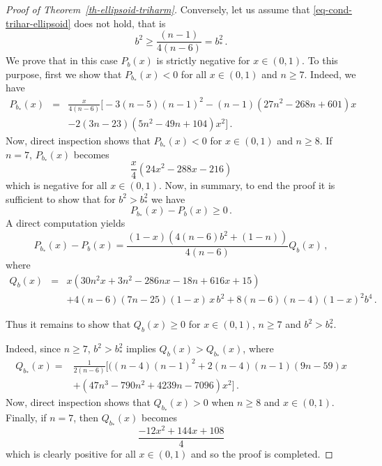 \documentclass[10pt,a4paper]{amsart}
\begin{document}
\begin{proof}[Proof of Theorem~\ref{th-ellipsoid-triharm}]
Conversely, let us assume that \eqref{eq-cond-trihar-ellipsoid} does not hold, that is
\[
b^2\geq\frac{(n-1)}{4(n-6)}=b_*^2\,.
\]
We prove that in this case $P_{b}(x)$ is strictly negative for $x \in(0,1)$. To this purpose, first we show that $P_{b_*}(x)<0$ for all $x\in (0,1)$ and $n\geq 7$. Indeed, we have 
\begin{eqnarray*}
P_{b_*}(x)&=& \frac{x}{4(n-6)}\Big [-3 (n-5) (n-1)^2-(n-1) \left(27 n^2-268 n+601\right) x\\
&&-2 (3 n-23) \left(5 n^2-49 n+104\right) x^2 \Big ]\,.
\end{eqnarray*}
Now, direct inspection shows that $P_{b_*}(x)<0$ for $x\in (0,1)$ and $n\geq 8$. If $n=7$, $P_{b_*}(x)$ becomes
\[
\frac{x}{4}(24 x^2-288 x-216)
\]
which is negative for all $x\in (0,1)$. Now, in summary, to end the proof it is sufficient to show that for $b^2> b_*^2$ we have
\[
P_{b_*}(x)-P_{b}(x)\geq 0\,.
\]
A direct computation yields
\[
P_{b_*}(x)-P_{b}(x)=\frac{(1-x) (4 (n-6)b^2+(1-n))}{4 (n-6)} Q_b(x)\,,
\]
where
\begin{eqnarray*}
Q_b(x)&=&x \left(30 n^2 x+3 n^2-286 n x-18 n+616 x+15\right)\\
&&+4 (n-6) (7 n-25) (1-x)\, x\, b^2+8 (n-6) (n-4) (1-x)^2 b^4\,.
\end{eqnarray*}

Thus it remains to show that $Q_b(x)\geq 0$ for $x\in (0,1)$, $n\geq 7$ and $b^2> b_*^2$.

Indeed, since $n\geq 7$, $b^2> b_*^2$ implies $Q_b(x)>Q_{b_*}(x)$, where
\[
\begin{split}
Q_{b_*}(x)=&\frac{1}{2(n-6)}\Big[((n-4) (n-1)^2+2 (n-4) (n-1) (9 n-59) x\\
&+\left(47 n^3-790 n^2+4239 n-7096\right) x^2\Big]\,.
\end{split}
\]
Now, direct inspection shows that $Q_{b_*}(x)>0$ when $n\geq 8$ and $x\in (0,1)$. Finally, if $n=7$, then $Q_{b_*}(x)$ becomes
\[
\frac{-12 x^2+144 x+108}{4}
\]
which is clearly positive for all $x\in (0,1)$ and so the proof is completed.
\end{proof}
\end{document}
